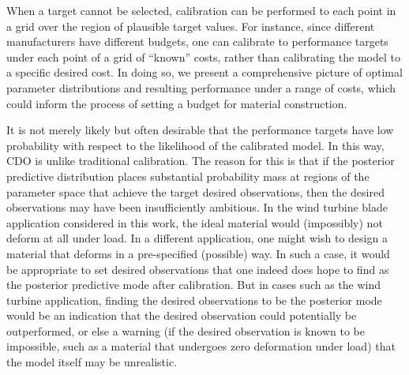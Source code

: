 \documentclass[12pt]{article}
\begin{document}
When a target cannot be selected, calibration can be performed to each point in a grid over the region of plausible target values.
%
For instance, since different manufacturers have different budgets, one can calibrate to performance targets under each point of a grid of ``known'' costs, rather than calibrating the model to a specific desired cost.
%
In doing so, we present a comprehensive picture of optimal parameter distributions and resulting performance under a range of costs, which could inform the process of setting a budget for material construction.


It is not merely likely but often desirable that the performance targets have low probability with respect to the likelihood of the calibrated model. 
%
In this way, CDO is unlike traditional calibration. 
%
The reason for this is that if the posterior predictive distribution places substantial probability mass at regions of the parameter space that achieve the target desired observations, then the desired observations may have been insufficiently ambitious. 
%
In the wind turbine blade application considered in this work, the ideal material would (impossibly) not deform at all under load.
In a different application, one might wish to design a material that deforms in a pre-specified (possible) way. 
In such a case, it would be appropriate to set desired observations that one indeed does hope to find as the posterior predictive mode after calibration. 
%
But in cases such as the wind turbine application, finding the desired observations to be the posterior mode would be an indication that the desired observation could potentially be outperformed, or else a warning (if the desired observation is known to be impossible, such as a material that undergoes zero deformation under load) that the model itself may be unrealistic. 
%
\end{document}
